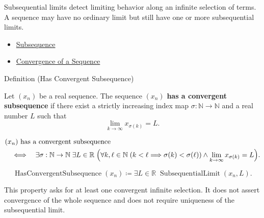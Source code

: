 \begin{remark*}[Interpretation]
Subsequential limits detect limiting behavior along an infinite selection of
terms. A sequence may have no ordinary limit but still have one or more
subsequential limits.
\end{remark*}

\begin{dependencies}
\begin{itemize}
  \item \hyperref[def:subsequence]{Subsequence}
  \item \hyperref[def:convergent-sequence]{Convergence of a Sequence}
\end{itemize}
\end{dependencies}


\begin{definitionbox}{Definition (Has Convergent Subsequence)}
\begin{definition}
\label{def:has-convergent-subsequence}
Let $(x_n)$ be a real sequence. The sequence $(x_n)$ \textbf{has a
convergent subsequence} if there exist a strictly increasing index map
$\sigma:\mathbb{N}\to\mathbb{N}$ and a real number $L$ such that
\[
  \lim_{k\to\infty}x_{\sigma(k)}=L.
\]
\end{definition}
\end{definitionbox}

\begin{remark*}
\[
\begin{aligned}
&(x_n)\text{ has a convergent subsequence}\\
&\quad\Longleftrightarrow\quad
\exists \sigma:\mathbb{N}\to\mathbb{N}\;\exists L\in\mathbb{R}\;
\Bigl(
  \forall k,\ell\in\mathbb{N}\;(k<\ell\Longrightarrow \sigma(k)<\sigma(\ell))
  \land
  \lim_{k\to\infty}x_{\sigma(k)}=L
\Bigr).
\end{aligned}
\]
\end{remark*}

\begin{remark*}
\[
\operatorname{HasConvergentSubsequence}(x_n)
\coloneqq
\exists L\in\mathbb{R}\;\operatorname{SubsequentialLimit}(x_n,L).
\]
\end{remark*}

\begin{remark*}[Interpretation]
This property asks for at least one convergent infinite selection. It does not
assert convergence of the whole sequence and does not require uniqueness of
the subsequential limit.
\end{remark*}

